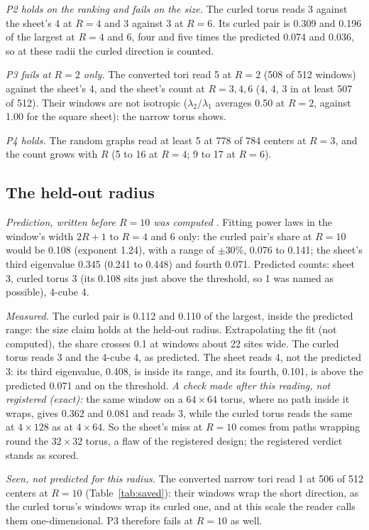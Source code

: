 \documentclass[aps,pre,10pt,twocolumn,superscriptaddress,nofootinbib]{revtex4-2}
\begin{document}
\emph{P2 holds on the ranking and fails on the size.} The curled torus reads 3 against the sheet's 4 at $R=4$ and 3
against 3 at $R=6$. Its curled pair is 0.309 and 0.196 of the largest at $R=4$ and 6, four and five times the
predicted 0.074 and 0.036, so at these radii the curled direction is counted.

\emph{P3 fails at $R=2$ only.} The converted tori read 5 at $R=2$ (508 of 512 windows) against the sheet's 4, and the
sheet's count at $R=3,4,6$ (4, 4, 3 in at least 507 of 512). Their windows are not isotropic ($\lambda_2/\lambda_1$
averages 0.50 at $R=2$, against 1.00 for the square sheet): the narrow torus shows.

\emph{P4 holds.} The random graphs read at least 5 at 778 of 784 centers at $R=3$, and the count grows with $R$
(5 to 16 at $R=4$; 9 to 17 at $R=6$).

\subsection{The held-out radius}

\emph{Prediction, written before $R=10$ was computed} \cite{prereg}. Fitting power laws in the window's width
$2R+1$ to $R=4$ and 6 only: the curled pair's share at $R=10$ would be 0.108 (exponent 1.24), with a range of
$\pm30\%$, 0.076 to 0.141; the sheet's third eigenvalue 0.345 (0.241 to 0.448) and fourth 0.071. Predicted counts:
sheet 3, curled torus 3 (its 0.108 sits just above the threshold, so 1 was named as possible), 4-cube 4.

\emph{Measured.} The curled pair is 0.112 and 0.110 of the largest, inside the predicted range: the size claim holds
at the held-out radius. Extrapolating the fit (not computed), the share crosses 0.1 at windows about 22 sites wide.
The curled torus reads 3 and the 4-cube 4, as predicted. The sheet reads 4, not the predicted 3: its third eigenvalue,
0.408, is inside its range, and its fourth, 0.101, is above the predicted 0.071 and on the threshold. \emph{A check
made after this reading, not registered (exact):} the same window on a $64\times64$ torus, where no path inside it
wraps, gives 0.362 and 0.081 and reads 3, while the curled torus reads the same at $4\times128$ as at $4\times64$. So
the sheet's miss at $R=10$ comes from paths wrapping round the $32\times32$ torus, a flaw of the registered design;
the registered verdict stands as scored.

\emph{Seen, not predicted for this radius.} The converted narrow tori read 1 at 506 of 512 centers at $R=10$
(Table~\ref{tab:saved}): their windows wrap the short direction, as the curled torus's windows wrap its curled one,
and at this scale the reader calls them one-dimensional. P3 therefore fails at $R=10$ as well.
\end{document}
